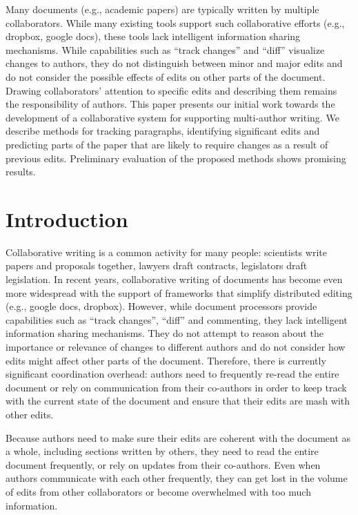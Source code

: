 Many documents (e.g., academic papers) are typically written by multiple
collaborators. While many existing tools support such collaborative
efforts (e.g., dropbox, google docs), these tools lack intelligent
information sharing mechanisms. While capabilities such as ``track
changes'' and ``diff'' visualize changes to authors, they do not
distinguish between minor and major edits and do not consider the
possible effects of edits on other parts of the document. Drawing
collaborators' attention to specific edits and describing them remains
the responsibility of authors. This paper presents our initial work
towards the development of a collaborative system for supporting
multi-author writing. We describe methods for tracking paragraphs,
identifying significant edits and predicting parts of the paper that are
likely to require changes as a result of previous edits. Preliminary
evaluation of the proposed methods shows promising results.

\section{Introduction}\label{introduction}

Collaborative writing is a common activity for many people: scientists
write papers and proposals together, lawyers draft contracts,
legislators draft legislation. In recent years, collaborative writing of
documents has become even more widespread with the support of frameworks
that simplify distributed editing (e.g., google docs, dropbox). However,
while document processors provide capabilities such as ``track
changes'', ``diff'' and commenting, they lack intelligent information
sharing mechanisms. They do not attempt to reason about the importance
or relevance of changes to different authors and do not consider how
edits might affect other parts of the document. Therefore, there is
currently significant coordination overhead: authors need to frequently
re-read the entire document or rely on communication from their
co-authors in order to keep track with the current state of the document
and ensure that their edits are mash with other edits.

Because authors need to make sure their edits are coherent with the
document as a whole, including sections written by others, they need to
read the entire document frequently, or rely on updates from their
co-authors. Even when authors communicate with each other frequently,
they can get lost in the volume of edits from other collaborators or
become overwhelmed with too much information.

